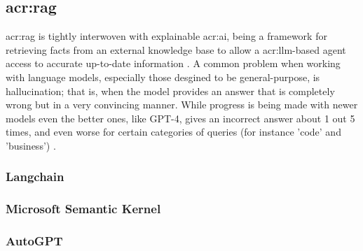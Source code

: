 \subsection[Retrieval Augmented Generation]{\acrfull{acr:rag}}

\gls{acr:rag} is tightly interwoven with explainable \acrshort{acr:ai}, being a framework for retrieving facts from an external knowledge base to allow a \acrshort{acr:llm}-based agent access to accurate up-to-date information \citep{martineauWhatRetrievalaugmentedGeneration2023}. A common problem when working with language models, especially those desgined to be general-purpose, is hallucination; that is, when the model provides an answer that is completely wrong but in a very convincing manner. While progress is being made with newer models even the better ones, like GPT-4, gives an incorrect answer about 1 out 5 times, and even worse for certain categories of queries (for instance 'code' and 'business') \citep[10]{openaiGPT4TechnicalReport2023}.

\subsubsection{Langchain}

\subsubsection{Microsoft Semantic Kernel}

\subsubsection{AutoGPT}

\glsresetall